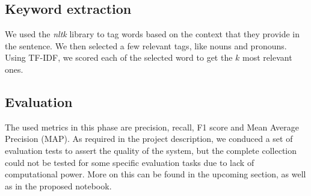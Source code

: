\subsection{Keyword extraction}
We used the \emph{nltk} library to tag words based on the context that they provide in the sentence. We then selected a few relevant tags, like nouns and pronouns. Using TF-IDF, we scored each of the selected word to get the $k$ most relevant ones. 

\subsection{Evaluation}
The used metrics in this phase are precision, recall, F1 score and Mean Average Precision (MAP).
As required in the project description, we conduced a set of evaluation tests to assert the quality of the system, but the complete collection could not be tested for some specific evaluation tasks due to lack of computational power. More on this can be found in the upcoming section, as well as in the proposed notebook.